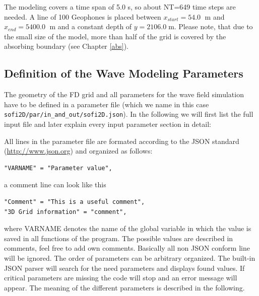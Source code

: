 \documentclass[11pt,onecolumn,oneside]{article}
\begin{document}
The modeling covers a time span of 5.0 s, so about NT=649 time steps are needed. A line of 100 Geophones is placed between $x_{start}=54.0\;$ m and $x_{end}=5400.0\;$ m and a constant depth of $y=2106.0\;$m. Please note, that due to the small size of the model, more than half of the grid is covered by the absorbing boundary (see Chapter \ref{abs}). 

\subsection{Definition of the Wave Modeling Parameters}
\label{modelgeom}
The geometry of the FD grid and all parameters for the wave field simulation have to be defined in a parameter file (which we name in this case {\texttt{sofi2D/par/in\_and\_out/sofi2D.json}}). In the following we will first list the full input file and later explain every input parameter section in detail:

All lines in the parameter file are formated according to the JSON standard (\url{http://www.json.org}) and organized as follows: 

\begin{verbatim}
"VARNAME" = "Parameter value",
\end{verbatim}

a comment line can look like this

\begin{verbatim}
"Comment" = "This is a useful comment",
"3D Grid information" = "comment",
\end{verbatim}

where VARNAME denotes the name of the global variable in which the value is saved in all functions of the program. The possible values are described in comments, feel free to add own comments. Basically all non JSON conform line will be ignored. The order of parameters can be arbitrary organized. The built-in JSON parser will search for the need parameters and displays found values. If critical parameters are missing the code will stop and an error message will appear. The meaning of the different parameters is described in the following.
\end{document}
